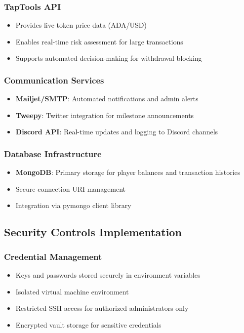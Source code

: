 \documentclass[11pt,a4paper]{article}
\begin{document}
\subsubsection{TapTools API}
\begin{itemize}
    \item Provides live token price data (ADA/USD)
    \item Enables real-time risk assessment for large transactions
    \item Supports automated decision-making for withdrawal blocking
\end{itemize}

\subsubsection{Communication Services}
\begin{itemize}
    \item \textbf{Mailjet/SMTP}: Automated notifications and admin alerts
    \item \textbf{Tweepy}: Twitter integration for milestone announcements
    \item \textbf{Discord API}: Real-time updates and logging to Discord channels
\end{itemize}

\subsubsection{Database Infrastructure}
\begin{itemize}
    \item \textbf{MongoDB}: Primary storage for player balances and transaction histories
    \item Secure connection URI management
    \item Integration via pymongo client library
\end{itemize}

\subsection{Security Controls Implementation}

\subsubsection{Credential Management}
\begin{itemize}
    \item Keys and passwords stored securely in environment variables
    \item Isolated virtual machine environment
    \item Restricted SSH access for authorized administrators only
    \item Encrypted vault storage for sensitive credentials
\end{itemize}
\end{document}
